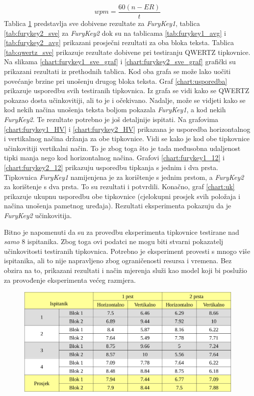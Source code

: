 \documentclass[times, utf8, zavrsni]{fer}
\begin{document}
\begin{equation}
\label{eq:wpm}
wpm = \frac{60(n-ER)}{t}
\end{equation}
Tablica \ref{tab:furykey1_sve} predstavlja sve dobivene rezultate za \emph{FuryKey1}, tablica \ref{tab:furykey2_sve} za \emph{FuryKey2} dok su na tablicama \ref{tab:furykey1_avg} i \ref{tab:furykey2_avg} prikazani prosječni rezultati za oba bloka teksta. Tablica \ref{tab:qwertz_sve} prikazuje rezultate dobivene pri testiranju QWERTZ tipkovnice.
Na slikama \ref{chart:furykey1_sve_graf} i \ref{chart:furykey2_sve_graf} grafički su prikazani rezultati iz prethodnih tablica. Kod oba grafa se može lako uočiti povećanje brzine pri unošenju drugog bloka teksta. Graf \ref{chart:usporedba} prikazuje usporedbu svih testiranih tipkovnica. Iz grafa se vidi kako se QWERTZ pokazao dosta učinkovitiji, ali to je i očekivano. Nadalje, može se vidjeti kako se kod nekih načina unošenja teksta boljom pokazala \emph{FuryKey1}, a kod nekih \emph{FuryKey2}. Te rezultate potrebno je još detaljnije ispitati. Na grafovima \ref{chart:furykey1_HV} i \ref{chart:furykey2_HV} prikazana je usporedba horizontalnog i vertikalnog načina držanja za obe tipkovnice. Vidi se kako je kod obe tipkovnice učinkovitiji vertikalni način. To je zbog toga što je tada međusobna udaljenost tipki manja nego kod horizontalnog načina. Grafovi \ref{chart:furykey1_12} i \ref{chart:furykey2_12} prikazuju usporedbu tipkanja s jednim i dva prsta. Tipkovnica \emph{FuryKey1} namijenjena je za korištenje s jednim prstom, a \emph{FuryKey2} za korištenje s dva prsta. To su rezultati i potvrdili. Konačno, graf \ref{chart:uk} prikazuje ukupnu usporedbu obe tipkovnice (cjelokupni prosjek svih položaja i načina unošenja pametnog uređaja). Rezultati eksperimenta pokazuju da je \emph{FuryKey2} učinkovitija.

Bitno je napomenuti da su za provedbu eksperimenta tipkovnice testirane nad \emph{samo} 8 ispitanika. Zbog toga ovi podatci ne mogu biti stvarni pokazatelj učinkovitosti testiranih tipkovnica. Potrebno je eksperiment provesti s mnogo više ispitanika, ali to nije napravljeno zbog ograničenosti resursa i vremena. Bez obzira na to, prikazani rezultati i način mjerenja služi kao model koji bi poslužio za provođenje eksperimenta većeg razmjera.

\begin{figure}[htb]
\centering
\includegraphics[width=12cm]{img/furykey1_sve.png}
\label{tab:furykey1_sve}
\end{figure}
\end{document}
